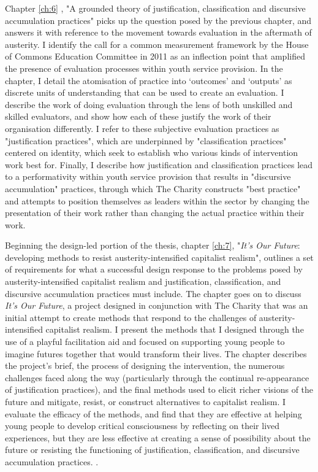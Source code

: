 Chapter \ref{ch:6} , "A grounded theory of justification, classification and discursive accumulation practices"  picks up the question posed by the previous chapter, and answers it with reference to the movement towards evaluation in the aftermath of austerity. I identify the call for a common measurement framework by the House of Commons Education Committee in 2011 as an inflection point that amplified the presence of evaluation processes within youth service provision. In the chapter, I detail the atomisation of practice into `outcomes' and `outputs' as discrete units of understanding that can be used to create an evaluation. I describe the work of doing evaluation through the lens of both unskilled and skilled evaluators, and show how each of these justify the work of their organisation differently. I refer to these subjective evaluation practices as "justification practices", which are underpinned by "classification practices" centered on identity, which seek to establish who various kinds of intervention work best for. Finally, I describe how justification and classification practices lead to a performativity within youth service provision that results in "discursive accumulation" practices, through which The Charity constructs "best practice" and attempts to position themselves as leaders within the sector by changing the presentation of their work rather than changing the actual practice within their work. 

Beginning the design-led portion of the thesis, chapter \ref{ch:7}, "\textit{It's Our Future}: developing methods to resist austerity-intensified capitalist realism", outlines a set of requirements for what a successful design response to the problems posed by austerity-intensified capitalist realism and justification, classification, and discursive accumulation practices must include. The chapter goes on to discuss \textit{It's Our Future}, a project designed in conjunction with The Charity that was an initial attempt to create methods that respond to the challenges of austerity-intensified capitalist realism. I present the methods that I designed through the use of a playful facilitation aid and focused on supporting young people to imagine futures together that would transform their lives. The chapter describes the project's brief, the process of designing the intervention, the numerous challenges faced along the way (particularly through the continual re-appearance of justification practices), and the final methods used to elicit richer visions of the future and mitigate, resist, or construct alternatives to capitalist realism. I evaluate the efficacy of the methods, and find that they are effective at helping young people to develop critical consciousness by reflecting on their lived experiences, but they are less effective at creating a sense of possibility about the future or resisting the functioning of justification, classification, and discursive accumulation practices. . 

